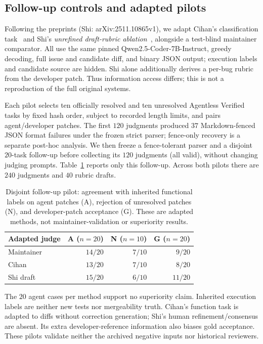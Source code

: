 \documentclass[10pt,conference]{IEEEtran}
\begin{document}
\subsection{Follow-up controls and adapted pilots}
\label{sec:adapted}
Following the preprints (Shi: arXiv:2511.10865v1), we adapt Cihan's classification task~\cite{cihanreview} and Shi's
\emph{unrefined draft-rubric ablation}~\cite{hitlpatch}, alongside a test-blind maintainer
comparator. All use the same pinned Qwen2.5-Coder-7B-Instruct, greedy decoding, full issue
and candidate diff, and binary JSON output; execution labels and candidate source are
hidden. Shi alone additionally derives a per-bug rubric from the developer patch.
Thus information access differs; this is not a reproduction of the full original systems.

Each pilot selects ten officially resolved and ten unresolved Agentless Verified tasks by
fixed hash order, subject to recorded length limits, and pairs agent/developer patches.
The first $120$ judgments produced $37$ Markdown-fenced JSON format failures under the
frozen strict parser; fence-only recovery is a separate post-hoc analysis. We then freeze
a fence-tolerant parser and a disjoint $20$-task follow-up before collecting its $120$
judgments (all valid), without changing judging prompts. Table~\ref{tab:adapted} reports
only this follow-up. Across both pilots there are $240$ judgments and $40$ rubric drafts.

\begin{table}[t]
\centering
\caption{Disjoint follow-up pilot: agreement with inherited functional labels on agent
patches (A), rejection of unresolved patches (N), and developer-patch acceptance (G).
These are adapted methods, not maintainer-validation or superiority results.}
\label{tab:adapted}
\footnotesize
\begin{tabular}{lrrr}
\toprule
Adapted judge & A ($n=20$) & N ($n=10$) & G ($n=20$) \\
\midrule
Maintainer & $14/20$ & $7/10$ & $9/20$ \\
Cihan & $13/20$ & $7/10$ & $8/20$ \\
Shi draft & $15/20$ & $6/10$ & $11/20$ \\
\bottomrule
\end{tabular}
\end{table}

The $20$ agent cases per method support no superiority claim. Inherited execution
labels are neither new tests nor mergeability truth. Cihan's function task is adapted
to diffs without correction generation; Shi's human refinement/consensus are absent.
Its extra developer-reference information also biases gold acceptance. These pilots
validate neither the archived negative inputs nor historical reviewers.
\end{document}
